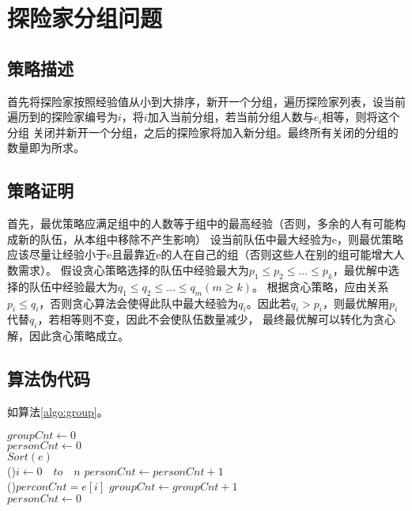\section{探险家分组问题}

\subsection{策略描述}
首先将探险家按照经验值从小到大排序，新开一个分组，遍历探险家列表，设当前遍历到的探险家编号为$i$，将$i$加入当前分组，若当前分组人数与$e_i$相等，则将这个分组
关闭并新开一个分组，之后的探险家将加入新分组。最终所有关闭的分组的数量即为所求。

\subsection{策略证明}

首先，最优策略应满足组中的人数等于组中的最高经验（否则，多余的人有可能构成新的队伍，从本组中移除不产生影响）
设当前队伍中最大经验为e，则最优策略应该尽量让经验小于e且最靠近e的人在自己的组（否则这些人在别的组可能增大人数需求）。
假设贪心策略选择的队伍中经验最大为$p_1 \le p_2 \le ...\le p_k$，最优解中选择的队伍中经验最大为$q_1 \le q_2 \le ... \le q_m(m \ge k)$。
根据贪心策略，应由关系$p_i \le q_i$，否则贪心算法会使得此队中最大经验为$q_i$。因此若$q_i > p_i$，则最优解用$p_i$代替$q_i$，若相等则不变，因此不会使队伍数量减少，
最终最优解可以转化为贪心解，因此贪心策略成立。


\subsection{算法伪代码}
如算法\ref{algo:group}。

\begin{algorithm}[H]
    \caption{$group(e[1..n])$}\label{algo:group}
    $groupCnt \leftarrow 0$\\
    $personCnt \leftarrow 0$\\
    $Sort(e)$\\
    \For(){$i \leftarrow 0 \quad to \quad n $}{
        $personCnt \leftarrow personCnt + 1$\\
        \If(){$perconCnt = e[i]$}{
            $groupCnt \leftarrow groupCnt + 1$\\
            $personCnt \leftarrow 0$\\
        }
    }
    
\end{algorithm}

